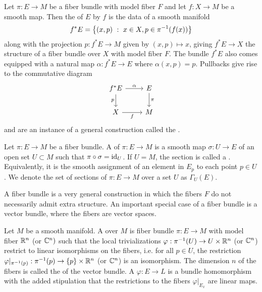 \begin{defn}
Let $\pi : E \to M$ be a fiber bundle with model fiber $F$
and let $f : X \to M$ be a smooth map. Then the  of $E$ by $f$ is
the data of a smooth manifold
\[
f^*E = \left\lbrace (x, p)~:~ x \in X, p \in \pi^{-1}(f(x))  \right\rbrace
\]
along with the projection $p : f^*E \to M$ given by $(x,p) \mapsto x$, giving
$f^*E \to X$ the structure of a fiber bundle over $X$ with model fiber $F$.
The bundle $f^*E$ also comes equipped with a natural map $\alpha : f^*E \to E$
where $\alpha(x,p) = p$. Pullbacks give rise to the commutative diagram
\[\begin{tikzcd}
f^*E \ar[d, "p"']\ar[r, "\alpha"] & E \ar[d, "\pi"] \\
X \ar[r, "f"']& M
\end{tikzcd}\]
and are an instance of a general construction called the .
\end{defn}
%
\begin{defn}
Let $\pi : E \to M$ be a fiber bundle. A  of $\pi : E \to M$
is a smooth map $\sigma : U \to E$ of an open set $U \subset M$ such that
$\pi \circ \sigma = \operatorname{id}_U$. If $U = M$, the section is called a .
Equivalently, it is the smooth assignment of an element in $E_p$ to each point
$p \in U$. We denote the set of sections of $\pi : E \to M$ over a set $U$
as $\Gamma_U(E)$.
\end{defn}
%
A fiber bundle is a very general construction in which the fibers $F$ do
not necessarily admit extra structure. An important special case of a fiber bundle
is a vector bundle, where the fibers are vector spaces.
%
\begin{defn}
Let $M$ be a smooth manifold. A  over $M$ is fiber bundle
$\pi : E \to M$ with model fiber $\mathbb{R}^n$ (or $\mathbb{C}^n)$ such that the local
trivializations $\varphi : \pi^{-1}(U) \to U \times \mathbb{R}^n$ (or $\mathbb{C}^n$)
restrict to linear isomorphisms on the fibers, i.e. for all $p \in U$, the restriction
$\varphi\vert_{\pi^{-1}(p)} : \pi^{-1}(p) \to \left\lbrace p \right\rbrace \times \mathbb{R}^n$
(or $\mathbb{C}^n$) is an isomorphism. The dimension $n$ of the fibers is called the
 of the vector bundle. A 
$\varphi : E \to L$ is a bundle homomorphism with the added stipulation that
the restrictions to the fibers $\varphi\vert_{E_x}$ are linear maps.
\end{defn}
%
